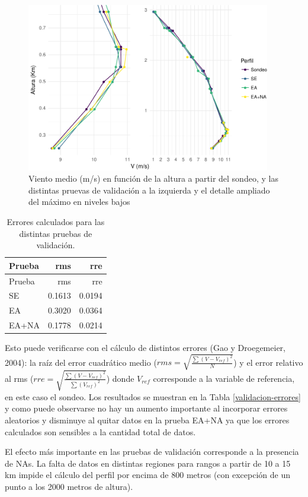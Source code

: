 \documentclass[12pt,spanish,oneside]{book}
\begin{document}
\begin{figure}
\includegraphics[width=0.95\textwidth, ]{Tesis_files/figure-latex/validacion-perfiles-1} \caption{Viento medio (m/s) en función de la altura a partir del sondeo, y las distintas pruevas de validación a la izquierda y el detalle ampliado del máximo en niveles bajos \label{validacion-perfiles}}\label{fig:validacion-perfiles}
\end{figure}

\begin{longtable}[]{@{}lrr@{}}
\caption{Errores calculados para las distintas pruebas de
validación.}\tabularnewline
\toprule
Prueba & rms & rre\tabularnewline
\midrule
\endfirsthead
\toprule
Prueba & rms & rre\tabularnewline
\midrule
\endhead
SE & 0.1613 & 0.0194\tabularnewline
EA & 0.3020 & 0.0364\tabularnewline
EA+NA & 0.1778 & 0.0214\tabularnewline
\bottomrule
\end{longtable}

Esto puede verificarse con el cálculo de distintos errores (Gao y
Droegemeier, 2004): la raíz del error cuadrático medio
(\(rms = \sqrt{ \frac{\sum (V-V_{ref})^2}{N} }\)) y el error relativo al
rms (\(rre = \sqrt{ \frac{\sum (V-V_{ref})^2}{\sum (V_{ref})^2} }\))
donde \(V_{ref}\) corresponde a la variable de referencia, en este caso
el sondeo. Los resultados se muestran en la Tabla
\ref{validacion-errores} y como puede observarse no hay un aumento
importante al incorporar errores aleatorios y disminuye al quitar datos
en la prueba EA+NA ya que los errores calculados son sensibles a la
cantidad total de datos.

El efecto más importante en las pruebas de validación corresponde a la
presencia de NAs. La falta de datos en distintas regiones para rangos a
partir de 10 a 15 km impide el cálculo del perfil por encima de 800
metros (con excepción de un punto a los 2000 metros de altura).
\end{document}
